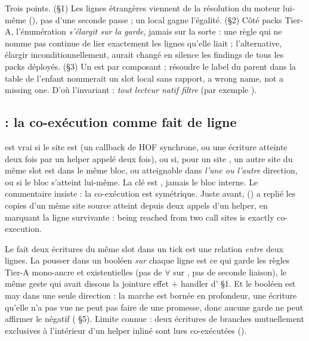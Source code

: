 \begin{decision}
Trois points. (§1) Les lignes étrangères viennent de la résolution du moteur lui-même (), pas d'une seconde passe ; un local gagne l'égalité. (§2) Côté packs Tier-A, l'énumération \emph{s'élargit sur la garde}, jamais sur la sorte : une règle qui ne nomme pas  continue de lier exactement les lignes qu'elle liait ; l'alternative, élargir inconditionnellement, aurait changé en silence les findings de tous les packs déployés. (§3) Un  est par composant ; résoudre le label du parent dans la table de l'enfant nommerait un slot local sans rapport, \og a wrong name, not a missing one\fg{}. D'où l'invariant : \emph{tout lecteur natif filtre } (par exemple ).
\end{decision}

\subsection{ : la co-exécution comme fait de ligne}


 est vrai si le site est  (un callback de HOF synchrone, ou une écriture atteinte deux fois par un helper appelé deux fois), ou si, pour un site , un autre site  du même slot est dans le même bloc, ou atteignable dans \emph{l'une ou l'autre} direction, ou si le bloc s'atteint lui-même. La clé est , jamais le bloc interne. Le commentaire insiste : la co-exécution est symétrique. Juste avant,  () a replié les copies d'un même site source atteint depuis deux appels d'un helper, en marquant la ligne survivante  : \og being reached from two call sites is exactly co-execution\fg{}.

\begin{decision}
Le fait \og deux écritures du même slot dans un tick\fg{} est une relation \emph{entre} deux lignes. La pousser dans un booléen \emph{sur} chaque ligne est ce qui garde les règles Tier-A mono-ancre et existentielles (pas de $\forall$ sur , pas de seconde liaison), le même geste qui avait dissous la jointure effet + handler d' §1. Et le booléen est may dans une seule direction : la marche est bornée en profondeur, une écriture qu'elle n'a pas vue ne peut pas faire de  une promesse, donc aucune garde ne peut affirmer le négatif ( §5). Limite connue : deux écritures de branches mutuellement exclusives à l'intérieur d'un helper inliné sont lues co-exécutées ().
\end{decision}

